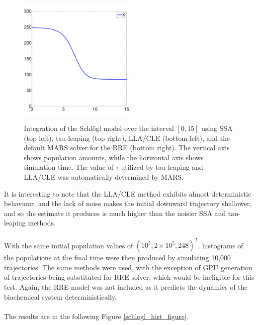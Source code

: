 \documentclass[ugrad,lot,lof,openright,11pt,oneside,onehalfspace]{RUthesis}
\begin{document}
\begin{figure}[H]
{			\includegraphics[width=0.5\textwidth]{figures/Schlogl_rre.pdf}
			}
		\captionsetup{width=0.8\textwidth}
		\caption[Integration of the Schl\"{o}gl model over {$[0,15]$}]{Integration of the Schl\"{o}gl model over the interval $[0,15]$ using SSA (top left), tau-leaping (top right), LLA/CLE (bottom left), and the default MARS solver for the RRE (bottom right). The vertical axis shows population amounts, while the horizontal axis shows simulation time. The value of $\tau$ utilized by tau-leaping and LLA/CLE was automatically determined by MARS.}
		\label{schlogl_figure}
		\end{figure}

		\noindent
		It is interesting to note that the LLA/CLE method exhibits almost deterministic behaviour, and the lack of noise makes the initial downward trajectory shallower, and so the estimate it produces is much higher than the noisier SSA and tau-leaping methods.\\
		\\
		With the same initial population values of $(10^5,2 \times 10^5,248)^T$, histograms of the populations at the final time were then produced by simulating 10,000 trajectories. The same methods were used, with the exception of GPU generation of trajectories being substituted for RRE solver, which would be ineligible for this test. Again, the RRE model was not included as it predicts the dynamics of the biochemical system deterministically.\\
		\\
		The results are in the following Figure \ref{schlogl_hist_figure}.
\end{document}
